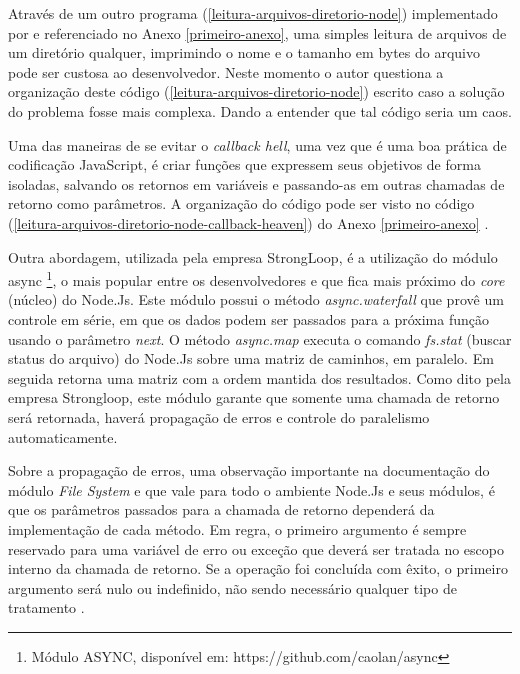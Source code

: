   Através de um outro programa (\ref{leitura-arquivos-diretorio-node}) implementado por  e referenciado no 
  Anexo \ref{primeiro-anexo}, uma simples leitura de arquivos de um diretório qualquer, imprimindo o nome e o tamanho em bytes do arquivo 
  pode ser custosa ao desenvolvedor. Neste momento o autor questiona a organização deste código (\ref{leitura-arquivos-diretorio-node}) escrito caso a solução do 
  problema fosse mais complexa. Dando a entender que tal código seria um caos.
  
  
  Uma das maneiras de se evitar o \textit{callback hell}, uma vez que é uma boa prática de codificação JavaScript, é
  criar funções que expressem seus objetivos de forma isoladas, salvando os retornos em variáveis e passando-as em outras
  chamadas de retorno como parâmetros. A organização do código pode ser visto no código (\ref{leitura-arquivos-diretorio-node-callback-heaven}) do
  Anexo \ref{primeiro-anexo} \cite{pereira}.
 
  Outra abordagem, utilizada pela empresa StrongLoop, é a utilização do módulo async \footnote{Módulo ASYNC, disponível em: https://github.com/caolan/async},
  o mais popular entre os desenvolvedores e que fica mais próximo do \textit{core} (núcleo) do Node.Js. Este módulo
  possui o método \textit{async.waterfall} que provê um controle em série, em que os dados podem ser passados para a próxima função
  usando o parâmetro \textit{next}. O método \textit{async.map} executa o comando \textit{fs.stat} (buscar status do arquivo) do Node.Js sobre uma matriz
  de caminhos, em paralelo. Em seguida retorna uma matriz com a ordem mantida dos resultados. Como dito pela empresa
  Strongloop, este módulo garante que somente uma chamada de retorno será retornada, haverá propagação de erros e controle do 
  paralelismo automaticamente. 
  
  Sobre a propagação de erros, uma observação importante na documentação do módulo \textit{File System} e que 
  vale para todo o ambiente Node.Js e seus módulos, é que os parâmetros passados para a chamada de retorno dependerá da 
  implementação de cada método. Em regra, o primeiro argumento é sempre reservado para uma variável de erro ou exceção 
  que deverá ser tratada no escopo interno da chamada de retorno. Se a operação foi concluída com êxito, o primeiro argumento 
  será nulo ou indefinido, não sendo necessário qualquer tipo de tratamento \cite{modulesystemfs}.
  
